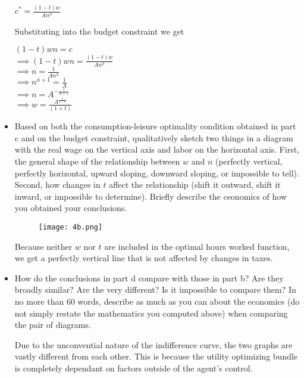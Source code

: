 \documentclass[11pt]{SelfArxOneColBMN}
\begin{document}
\begin{exercise}
\begin{itemize}
\begin{solution}
\begin{center}
				$c^* = \frac{(1 - t)w}{An^\phi}$
			\end{center}
		Substituting into the budget constraint we get
			\begin{center}
				$(1 - t)wn = c$\\
				$\implies(1 - t)wn = \frac{(1 - t)w}{An^\phi}$\\
				$\implies n = \frac{1}{An^\phi}$\\
				$\implies n^{\phi + 1} = \frac{1}{A}$\\
				$\implies n =  A^{-\frac{1}{\phi + 1}}$\\
				$\implies w = \frac{A^{\frac{1}{1 + \phi}}}{(1 + t)}$
			\end{center}
		\end{solution}
		\item Based on both the consumption-leisure optimality condition obtained in part c and on the budget constraint, qualitatively sketch two things in a diagram with the real wage on the vertical axis and labor on the horizontal axis. First, the general shape of the relationship between $w$ and $n$ (perfectly vertical, perfectly horizontal, upward sloping, downward sloping, or impossible to tell). Second, how changes in $t$ affect the relationship (shift it outward, shift it inward, or impossible to determine). Briefly describe the ceonomics of how you obtained your conclusions.
		\begin{solution}
			\begin{figure}
				\texttt{[image: 4b.png]}
			\end{figure}
			Because neither $w$ nor $t$ are included in the optimal hours worked function, we get a perfectly vertical line that is not affected by changes in taxes.
		\end{solution}
		\item How do the conclusions in part d compare with those in part b? Are they broadly similar? Are the very different? Is it impossible to compare them? In no more than 60 words, describe as much as you can about the economics (do not simply restate the mathematics you computed above) when comparing the pair of diagrams.
		\begin{solution}
			Due to the unconvential nature of the indifference curve, the two graphs are vastly different from each other. This is because the utility optimizing bundle is completely dependant on factors outside of the agent's control.
		\end{solution}
	\end{itemize}
\end{exercise}
\end{document}
